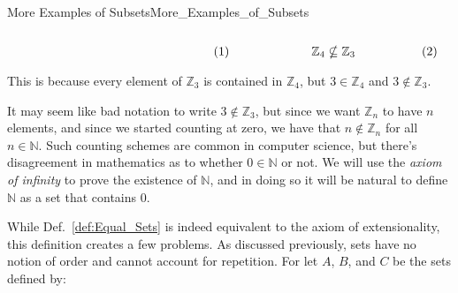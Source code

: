\begin{lexample}{More Examples of Subsets}{More_Examples_of_Subsets}
\begin{subequations}
\begin{minipage}[b]{0.49\textwidth}
\begin{equation}
                    \end{equation}
                \end{minipage}
                \hfill
                \begin{minipage}[b]{0.49\textwidth}
                    \centering
                    \begin{equation}
                        \mathbb{Z}_{4}\nsubseteq\mathbb{Z}_{3}
                    \end{equation}
                \end{minipage}
            \end{subequations}
            \par\vspace{2.5ex}
            This is because every element of $\mathbb{Z}_{3}$ is contained in
            $\mathbb{Z}_{4}$, but $3\in\mathbb{Z}_{4}$ and
            $3\notin\mathbb{Z}_{3}$.
        \end{lexample}
        It may seem like bad notation to write $3\notin\mathbb{Z}_{3}$, but
        since we want $\mathbb{Z}_{n}$ to have $n$ elements, and since we
        started counting at zero, we have that $n\notin\mathbb{Z}_{n}$ for all
        $n\in\mathbb{N}$. Such counting schemes are common in computer science,
        but there's disagreement in mathematics as to whether $0\in\mathbb{N}$
        or not. We will use the
        \textit{axiom of infinity} to prove the
        existence of $\mathbb{N}$, and in doing so it will be natural to define
        $\mathbb{N}$ as a set that contains $0$.
        \par\hfill\par
        While Def.~\ref{def:Equal_Sets} is indeed equivalent to the axiom of
        extensionality, this definition creates a few problems. As discussed
        previously, sets have no notion of order and cannot account for
        repetition. For let $A$, $B$, and $C$ be the sets defined by:
        \par
